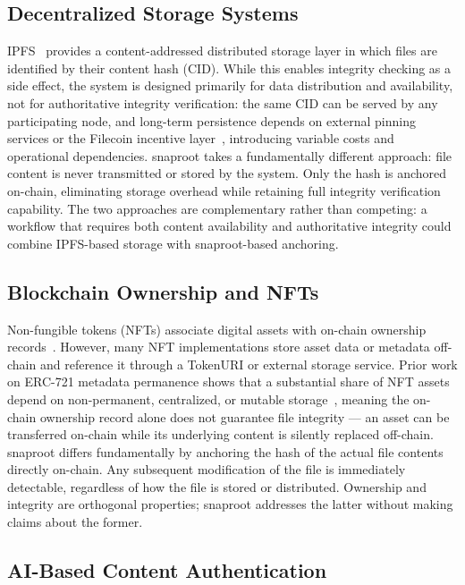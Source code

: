 \documentclass[11pt,a4paper]{article}
\begin{document}
\subsection{Decentralized Storage Systems}

IPFS~\cite{benet2014ipfs} provides a content-addressed distributed
storage layer in which files are identified by their content hash (CID).
While this enables integrity checking as a side effect, the system is
designed primarily for data distribution and availability, not for
authoritative integrity verification: the same CID can be served by any
participating node, and long-term persistence depends on external pinning
services or the Filecoin incentive layer~\cite{protocollabs2017filecoin},
introducing variable costs and operational dependencies. snaproot takes
a fundamentally different approach: file content is never transmitted or
stored by the system. Only the hash is anchored on-chain, eliminating
storage overhead while retaining full integrity verification capability.
The two approaches are complementary rather than competing: a workflow
that requires both content availability and authoritative integrity
could combine IPFS-based storage with snaproot-based anchoring.

\subsection{Blockchain Ownership and NFTs}

Non-fungible tokens (NFTs) associate digital assets with on-chain
ownership records~\cite{entriken2018erc721}. However, many NFT
implementations store asset data or metadata off-chain and reference it
through a TokenURI or external storage service. Prior work on ERC-721
metadata permanence shows that a substantial share of NFT assets depend
on non-permanent, centralized, or mutable
storage~\cite{barrington2022nft}, meaning the on-chain ownership record
alone does not guarantee file integrity --- an asset can be transferred
on-chain while its underlying content is silently replaced off-chain.
snaproot differs fundamentally by anchoring the hash of the actual file
contents directly on-chain. Any subsequent modification of the file is
immediately detectable, regardless of how the file is stored or
distributed. Ownership and integrity are orthogonal properties; snaproot
addresses the latter without making claims about the former.

\subsection{AI-Based Content Authentication}
\end{document}
